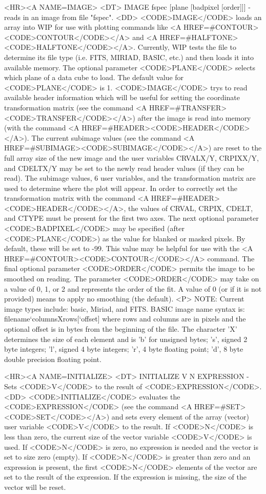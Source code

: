 \begin{rawhtml}
<HR><A NAME=IMAGE>
<DT>
IMAGE fspec [plane [badpixel [order]]] - reads in an image from file "fspec".
<DD>
	<CODE>IMAGE</CODE> loads an array into WIP for use with plotting
	commands like <A HREF=#CONTOUR><CODE>CONTOUR</CODE></A> and
	<A HREF=#HALFTONE><CODE>HALFTONE</CODE></A>.
	Currently, WIP tests the file to determine its file type (i.e.
	FITS, MIRIAD, BASIC, etc.) and then loads it into available memory.
	The optional parameter <CODE>PLANE</CODE> selects which plane of
	a data cube to load.  The default value for <CODE>PLANE</CODE> is 1.
	<CODE>IMAGE</CODE> trys to read available header information which
	will be useful for setting the coordinate transformation matrix
	(see the command <A HREF=#TRANSFER><CODE>TRANSFER</CODE></A>)
	after the image is read into memory (with the command
	<A HREF=#HEADER><CODE>HEADER</CODE></A>).  The current subimage
	values (see the command <A HREF=#SUBIMAGE><CODE>SUBIMAGE</CODE></A>)
	are reset to the full array size of the new image and the user
	variables CRVALX/Y, CRPIXX/Y, and CDELTX/Y may be set to the newly
	read header values (if they can be read).  The subimage values,
	6 user variables, and the transformation matrix are used to
	determine where the plot will appear.  In order to correctly
	set the transformation matrix with the command
	<A HREF=#HEADER><CODE>HEADER</CODE></A>, the values of CRVAL,
	CRPIX, CDELT, and CTYPE must be present for the first two axes.
	The next optional parameter <CODE>BADPIXEL</CODE> may be
	specified (after <CODE>PLANE</CODE>) as the value for blanked or
	masked pixels.
	By default, these will be set to -99.
	This value may be helpful for use
	with the <A HREF=#CONTOUR><CODE>CONTOUR</CODE></A> command.
	The final optional parameter <CODE>ORDER</CODE> permits the
	image to be smoothed on reading.  The parameter <CODE>ORDER</CODE>
	may take on a value of 0, 1, or 2 and represents the order of
	the fit.  A value of 0 (or if it is not provided) means to apply
	no smoothing (the default).
	<P>
	NOTE: Current image types include:
	basic, Miriad, and FITS.
	BASIC image name syntax is: filename`columnsXrows[`offset] where
	rows and columns are in pixels and the optional offset is in
	bytes from the beginning of the file.  The character 'X' determines
	the size of each element and is 'b' for unsigned bytes; 's',
	signed 2 byte integers; 'l', signed 4 byte integers; 'r', 4 byte
	floating point; 'd', 8 byte double precision floating point.

<HR><A NAME=INITIALIZE>
<DT>
INITIALIZE V N EXPRESSION - Sets <CODE>V</CODE> to the result of <CODE>EXPRESSION</CODE>.
<DD>
	<CODE>INITIALIZE</CODE> evaluates the <CODE>EXPRESSION</CODE>
	(see the command <A HREF=#SET><CODE>SET</CODE></A>) and sets
	every element of the array (vector) user variable <CODE>V</CODE>
	to the result.  If <CODE>N</CODE> is less than zero, the current
	size of the vector variable <CODE>V</CODE> is used.  If
	<CODE>N</CODE> is zero, no expression is needed and the vector
	is set to size zero (empty).  If <CODE>N</CODE> is greater than
	zero and an expression is present, the first <CODE>N</CODE>
	elements of the vector are set to the result of the expression.
	If the expression is missing, the size of the vector will be reset.


\end{rawhtml}
